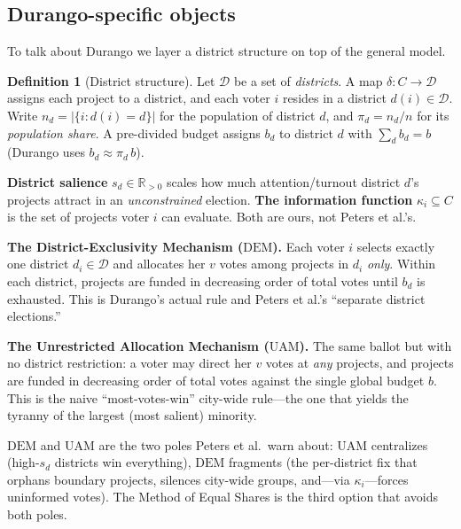 \documentclass[11pt,letterpaper]{article}
\theoremstyle{definition}
\newtheorem{definition}{Definition}[section]
\theoremstyle{plain}
\theoremstyle{remark}
\newcommand{\R}{\mathbb{R}}
\newcommand{\projects}{C}          %
\newcommand{\budget}{b}            %
\newcommand{\votes}{v}             %
\newcommand{\Dist}{\mathcal{D}}    %
\newcommand{\popshare}{\pi}        %
\newcommand{\DEM}{\mathrm{DEM}}
\newcommand{\UAM}{\mathrm{UAM}}
\begin{document}
\subsection{Durango-specific objects}

To talk about Durango we layer a district structure on top of the general model.

\begin{definition}[District structure]
Let $\Dist$ be a set of \emph{districts}. A map $\delta\colon \projects\to\Dist$ assigns each
project to a district, and each voter $i$ resides in a district $d(i)\in\Dist$. Write
$n_d=|\{i: d(i)=d\}|$ for the population of district $d$, and $\popshare_d=n_d/n$ for its
\emph{population share}. A pre-divided budget assigns $\budget_d$ to district $d$ with
$\sum_d \budget_d=\budget$ (Durango uses $\budget_d \approx \popshare_d\,\budget$).
\end{definition}

\begin{naming}
\textbf{District salience} $s_d\in\R_{>0}$ scales how much attention/turnout district $d$'s projects
attract in an \emph{unconstrained} election. \textbf{The information function} $\kappa_i\subseteq
\projects$ is the set of projects voter $i$ can evaluate. Both are ours, not Peters et al.'s.
\end{naming}

\begin{naming}
\textbf{The District-Exclusivity Mechanism ($\DEM$).} Each voter $i$ selects exactly one district
$d_i\in\Dist$ and allocates her $\votes$ votes among projects in $d_i$ \emph{only}. Within each
district, projects are funded in decreasing order of total votes until $\budget_d$ is exhausted.
This is Durango's actual rule and Peters et al.'s ``separate district elections.''
\end{naming}

\begin{naming}
\textbf{The Unrestricted Allocation Mechanism ($\UAM$).} The same ballot but with no district
restriction: a voter may direct her $\votes$ votes at \emph{any} projects, and projects are funded
in decreasing order of total votes against the single global budget $\budget$. This is the naive
``most-votes-win'' city-wide rule---the one that yields the tyranny of the largest (most salient)
minority.
\end{naming}

\begin{intuition}
$\DEM$ and $\UAM$ are the two poles Peters et al.\ warn about: $\UAM$ centralizes (high-$s_d$
districts win everything), $\DEM$ fragments (the per-district fix that orphans boundary projects,
silences city-wide groups, and---via $\kappa_i$---forces uninformed votes). The Method of Equal
Shares is the third option that avoids both poles.
\end{intuition}
\end{document}
